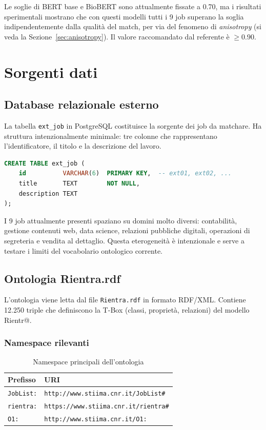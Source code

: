 \documentclass[12pt, a4paper]{report}
\begin{document}
\begin{warnbox}
Le soglie di BERT base e BioBERT sono attualmente fissate a 0.70, ma
i risultati sperimentali mostrano che con questi modelli tutti i 9 job
superano la soglia indipendentemente dalla qualità del match, per via
del fenomeno di \emph{anisotropy} (si veda la Sezione~\ref{sec:anisotropy}).
Il valore raccomandato dal referente è $\geq 0.90$.
\end{warnbox}

% 
\chapter{Sorgenti dati}
% 

\section{Database relazionale esterno}

La tabella \texttt{ext\_job} in PostgreSQL costituisce la sorgente
dei job da matchare. Ha struttura intenzionalmente minimale: tre
colonne che rappresentano l'identificatore, il titolo e la
descrizione del lavoro.

\begin{lstlisting}[language=SQL, caption={Schema della tabella ext\_job}]
CREATE TABLE ext_job (
    id          VARCHAR(6)  PRIMARY KEY,  -- ext01, ext02, ...
    title       TEXT        NOT NULL,
    description TEXT
);
\end{lstlisting}

I 9 job attualmente presenti spaziano su domini molto diversi:
contabilità, gestione contenuti web, data science, relazioni
pubbliche digitali, operazioni di segreteria e vendita al dettaglio.
Questa eterogeneità è intenzionale e serve a testare i limiti del
vocabolario ontologico corrente.

\section{Ontologia Rientra.rdf}

L'ontologia viene letta dal file \texttt{Rientra.rdf} in formato
RDF/XML. Contiene 12.250 triple che definiscono la T-Box
(classi, proprietà, relazioni) del modello Rientr@.

\subsection{Namespace rilevanti}

\begin{table}[H]
\centering
\begin{tabular}{ll}
\toprule
\textbf{Prefisso} & \textbf{URI} \\
\midrule
\texttt{JobList:} & \texttt{http://www.stiima.cnr.it/JobList\#} \\
\texttt{rientra:} & \texttt{https://www.stiima.cnr.it/rientra\#} \\
\texttt{O1:}      & \texttt{http://www.stiima.cnr.it/O1:} \\
\bottomrule
\end{tabular}
\caption{Namespace principali dell'ontologia}
\end{table}
\end{document}
